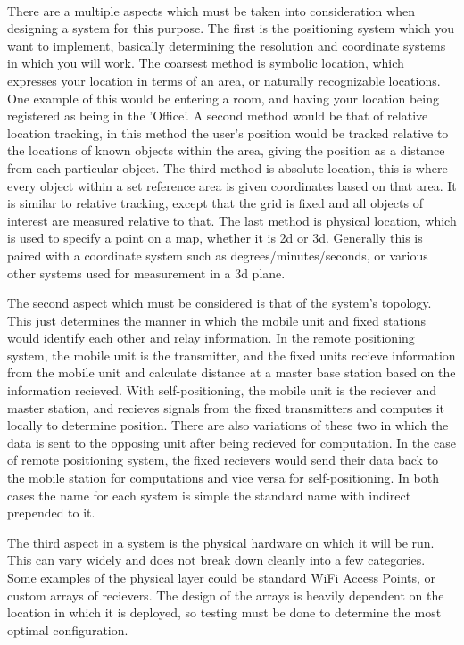 \documentclass{article}
\begin{document}
\paragraph*{}
There are a multiple aspects which must be taken into consideration when designing a system for this purpose. The first is the positioning system which you want to implement, basically determining the resolution and coordinate systems in which you will work. The coarsest method is symbolic location, which expresses your location in terms of an area, or naturally recognizable locations. One example of this would be entering a room, and having your location being registered as being in the 'Office'. A second method would be that of relative location tracking, in this method the user's position would be tracked relative to the locations of known objects within the area, giving the position as a distance from each particular object. The third method is absolute location, this is where every object within a set reference area is given coordinates based on that area. It is similar to relative tracking, except that the grid is fixed and all objects of interest are measured relative to that. The last method is physical location, which is used to specify a point on a map, whether it is 2d or 3d. Generally this is paired with a coordinate system such as degrees/minutes/seconds, or various other systems used for measurement in a 3d plane.


The second aspect which must be considered is that of the system's topology. This just determines the manner in which the mobile unit and fixed stations would identify each other and relay information. In the remote positioning system, the mobile unit is the transmitter, and the fixed units recieve information from the mobile unit and calculate distance at a master base station based on the information recieved. With self-positioning, the mobile unit is the reciever and master station, and recieves signals from the fixed transmitters and computes it locally to determine position. There are also variations of these two in which the data is sent to the opposing unit after being recieved for computation. In the case of remote positioning system, the fixed recievers would send their data back to the mobile station for computations and vice versa for self-positioning. In both cases the name for each system is simple the standard name with indirect prepended to it.


The third aspect in a system is the physical hardware on which it will be run. This can vary widely and does not break down cleanly into a few categories. Some examples of the physical layer could be standard WiFi Access Points, or custom arrays of recievers. The design of the arrays is heavily dependent on the location in which it is deployed, so testing must be done to determine the most optimal configuration.
\end{document}
